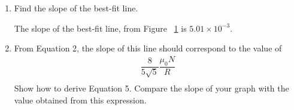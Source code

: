 \documentclass [12pt, letterpaper, twoside] {article}
\begin{document}
\begin{enumerate}
\begin{enumerate}
        The plot of \(B(0)\) versus \(I\) is shown in Figure ~\ref{fig:3}.
        \bzero

        \begin{figure}
          \centering
          \caption{}
          \label{fig:3}
        \end{figure}

      \item{Find the slope of the best-fit line.}

        The slope of the best-fit line, from Figure ~\ref{fig:3} is \(5.01\times{10}^{-3}\).

      \item{From Equation 2, the slope of this line should correspond to the value of
        \begin{equation*}
          \begin{split}
            \dfrac{8}{5\sqrt{5}}\dfrac{\mu_{0}N}{R} \\
          \end{split}
        \end{equation*}
      Show how to derive Equation 5. Compare the slope of your graph with the value obtained from this expression.}


\end{enumerate}
\end{enumerate}
\end{document}
